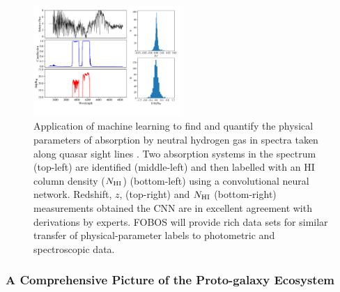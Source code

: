 \documentclass[oneside,11pt]{amsart}
\begin{document}
\begin{figure}\small
%
\includegraphics[width=0.5\textwidth]{figs/Parks_fig.pdf}
%
\caption{Application of machine learning to find and quantify the
physical parameters of absorption by neutral hydrogen gas in spectra
taken along quasar sight lines \citep[adapted from Figs 7 and 14
from][]{parks18}.  Two absorption systems in the spectrum (top-left) are
identified (middle-left) and then labelled with an HI column density
($N_{\rm HI}$) (bottom-left) using a convolutional neural network.
Redshift, $z$, (top-right) and $N_{\rm HI}$ (bottom-right) measurements
obtained the CNN are in excellent agreement with derivations by experts.
FOBOS will provide rich data sets for similar transfer of
physical-parameter labels to photometric and spectroscopic data.}
%
\label{fig:absorber}
%
\end{figure}

\subsubsection{A Comprehensive Picture of the Proto-galaxy Ecosystem}
\label{sec:galaxies}

%
%
%
%
\end{document}
